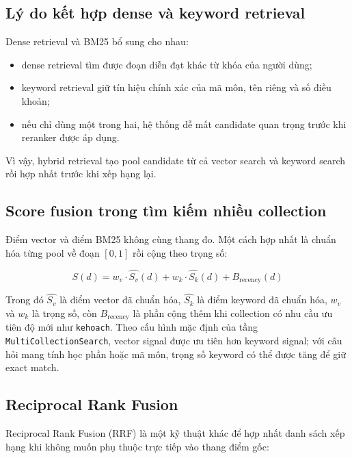 \documentclass[../DoAn.tex]{subfiles}
\begin{document}
\subsection{Lý do kết hợp dense và keyword retrieval}

Dense retrieval và BM25 bổ sung cho nhau:

\begin{itemize}
    \item dense retrieval tìm được đoạn diễn đạt khác từ khóa của người dùng;
    \item keyword retrieval giữ tín hiệu chính xác của mã môn, tên riêng và số
    điều khoản;
    \item nếu chỉ dùng một trong hai, hệ thống dễ mất candidate quan trọng trước
    khi reranker được áp dụng.
\end{itemize}

Vì vậy, hybrid retrieval tạo pool candidate từ cả vector search và keyword search
rồi hợp nhất trước khi xếp hạng lại.

\subsection{Score fusion trong tìm kiếm nhiều collection}

Điểm vector và điểm BM25 không cùng thang đo. Một cách hợp nhất là chuẩn hóa từng
pool về đoạn $[0,1]$ rồi cộng theo trọng số:

\begin{equation}
S(d) =
w_v \cdot \widehat{S_v}(d)
+ w_k \cdot \widehat{S_k}(d)
+ B_{\text{recency}}(d)
\end{equation}

Trong đó $\widehat{S_v}$ là điểm vector đã chuẩn hóa, $\widehat{S_k}$ là điểm
keyword đã chuẩn hóa, $w_v$ và $w_k$ là trọng số, còn
$B_{\text{recency}}$ là phần cộng thêm khi collection có nhu cầu ưu tiên độ mới
như \texttt{kehoach}. Theo cấu hình mặc định của tầng
\texttt{MultiCollectionSearch}, vector signal được ưu tiên hơn keyword signal;
với câu hỏi mang tính học phần hoặc mã môn, trọng số keyword có thể được tăng để
giữ exact match.

\subsection{Reciprocal Rank Fusion}

Reciprocal Rank Fusion (RRF) là một kỹ thuật khác để hợp nhất danh sách xếp hạng
khi không muốn phụ thuộc trực tiếp vào thang điểm gốc:
\end{document}
